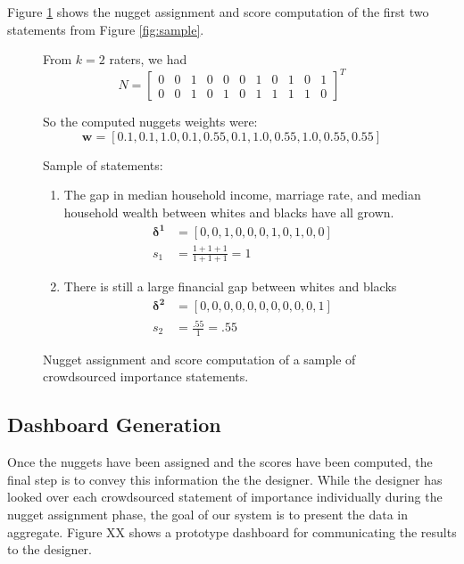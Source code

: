 \documentclass{sigchi}
\begin{document}
Figure \ref{fig:scorecomp} shows the nugget assignment and score
computation of the first two statements from Figure \ref{fig:sample}.

\setcounter{MaxMatrixCols}{20}

\begin{figure}[t]
  \begin{framed}
    From $k=2$ raters, we had
    \[
    N = \begin{bmatrix}
    0 & 0 & 1 & 0 & 0 & 0 & 1 & 0 & 1 & 0 & 1 \\
    0 & 0 & 1 & 0 & 1 & 0 & 1 & 1 & 1 & 1 & 0
    \end{bmatrix}^T
    \]

    So the computed nuggets weights were:
    \[\mathbf{w}=\left[0.1,0.1,1.0,0.1,0.55,0.1,1.0,0.55,1.0,0.55,0.55\right]\]

    Sample of statements:
    \begin{enumerate}
    \item The gap in median household income, marriage rate, and
    median household wealth between whites and blacks have all grown.
    \begin{align*}
    \mathbf{\delta^1} &= \left[0,0,1,0,0,0,1,0,1,0,0\right]\\
    s_1 &= \frac{1 + 1 + 1}{1 + 1 + 1} = 1
    \end{align*}

    \item There is still a large financial gap between whites and blacks
    \begin{align*}
    \mathbf{\delta^2} &= \left[0,0,0,0,0,0,0,0,0,0,1\right]\\
    s_2 &= \frac{.55}{1} = .55
    \end{align*}
  \end{enumerate}

  \end{framed}
  \caption{Nugget assignment and score computation of a sample of crowdsourced importance statements.}
  \label{fig:scorecomp}
\end{figure}

\subsection{Dashboard Generation}

Once the nuggets have been assigned and the scores have been computed,
the final step is to convey this information the the designer. While
the designer has looked over each crowdsourced statement of importance
individually during the nugget assignment phase, the goal of our
system is to present the data in aggregate. Figure XX shows a
prototype dashboard for communicating the results to the designer.
\end{document}
